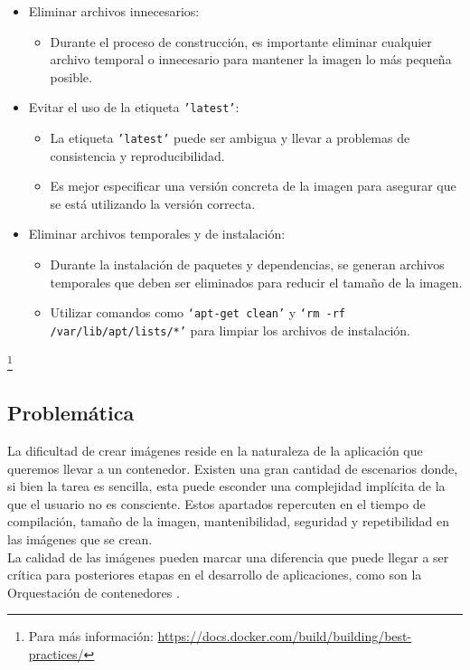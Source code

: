 \documentclass[12pt, a4paper, twoside]{article}
\begin{document}
\begin{itemize}
    \item Eliminar archivos innecesarios:
    \begin{itemize}
        \item Durante el proceso de construcción, es importante eliminar cualquier archivo temporal o innecesario para mantener la imagen lo más pequeña posible.
    \end{itemize}
    
    \item Evitar el uso de la etiqueta \texttt{'latest'}:
    \begin{itemize}
        \item La etiqueta \texttt{'latest'} puede ser ambigua y llevar a problemas de consistencia y reproducibilidad.
        \item Es mejor especificar una versión concreta de la imagen para asegurar que se está utilizando la versión correcta.
    \end{itemize}
    
    \item Eliminar archivos temporales y de instalación:
    \begin{itemize}
        \item Durante la instalación de paquetes y dependencias, se generan archivos temporales que deben ser eliminados para reducir el tamaño de la imagen.
        \item Utilizar comandos como \texttt{`apt-get clean'} y \texttt{`rm -rf /var/lib/apt/lists/*'} para limpiar los archivos de instalación.
    \end{itemize}
    

    
\end{itemize}
\footnote{Para más información: \href{https://docs.docker.com/build/building/best-practices/}{https://docs.docker.com/build/building/best-practices/}}
\newpage 

\subsection{Problemática}
La dificultad de crear imágenes reside en la naturaleza de la aplicación que queremos llevar a un contenedor. Existen una gran cantidad de escenarios donde, si bien la tarea es sencilla, esta puede esconder una complejidad implícita de la que el usuario no es consciente. 
Estos apartados repercuten en el tiempo de compilación, tamaño de la imagen, mantenibilidad, seguridad y repetibilidad en las imágenes que se crean. \\
La calidad de las imágenes pueden marcar una diferencia que puede llegar a ser crítica para posteriores etapas en el desarrollo de aplicaciones, como son la Orquestación de contenedores \cite{ibm_container_orchestration}.
\end{document}
